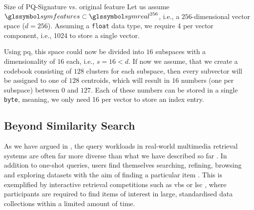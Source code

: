 \begin{example}[label=example:pq_compression]{Size of PQ-Signature vs. original feature}{}
    Let us assume $\symfeatures \subset \symreal^{256}$, i.e., a $256$-dimensional vector space ($d = 256$). Assuming a \texttt{float} data type, we require \SI{4}{\byte} per vector component, i.e., \SI{1024}{\byte} to store a single vector.
    
    Using \acrshort{pq}, this space could now be divided into $16$ subspaces with a dimensionality of $16$ each, i.e., $s = 16 < d$. If now we assume, that we create a codebook consisting of $128$ clusters for each subspace, then every subvector will be assigned to one of $128$ centroids, which will result in $16$ numbers (one per subspace) between $0$ and $127$. Each of these numbers can be stored in a single \texttt{byte}, meaning, we only need \SI{16}{\byte} per vector to store an index entry.
\end{example}

\subsection{Beyond Similarity Search}
As we have argued in , the query workloads in real-world multimedia retrieval systems are often far more diverse than what we have described so far . In addition to one-shot queries, users find themselves searching, refining, browsing and exploring datasets with the aim of finding a particular item \cite{Lokovc:2019Interactive,Rossetto:2020Interactive}. This is exemplified by interactive retrieval competitions such as \acrshort{vbs} \cite{Schoeffmann:2019Video,Lokovc:2018Influential} or \acrshort{lsc} \cite{Gurrin:2021Introduction}, where participants are required to find items of interest in large, standardised data collections \cite{Berns:2019V3C1,Rossetto:2021Insights} within a limited amount of time.



